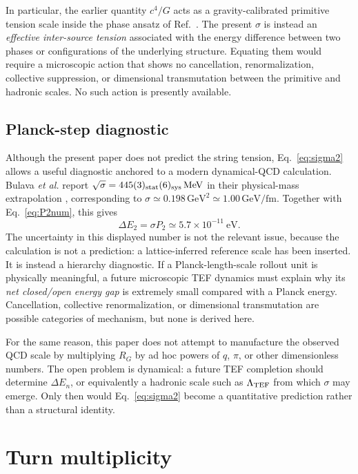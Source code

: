\documentclass[10pt]{article}
\begin{document}
In particular, the earlier quantity $c^4/G$ acts as a gravity-calibrated primitive tension scale inside the phase ansatz of Ref.~\cite{WuWeakMixing}.  The present $\sigma$ is instead an \emph{effective inter-source tension} associated with the energy difference between two phases or configurations of the underlying structure.  Equating them would require a microscopic action that shows no cancellation, renormalization, collective suppression, or dimensional transmutation between the primitive and hadronic scales.  No such action is presently available.


\subsection{Planck-step diagnostic}

Although the present paper does not predict the string tension, Eq.~\eqref{eq:sigma2} allows a useful diagnostic anchored to a modern dynamical-QCD calculation. Bulava \emph{et al.} report $\sqrt{\sigma}=445(3)_{\rm stat}(6)_{\rm sys}\,\mathrm{MeV}$ in their physical-mass extrapolation \cite{Bulava2024}, corresponding to $\sigma\simeq0.198\,\mathrm{GeV}^2\simeq1.00\,\mathrm{GeV/fm}$. Together with Eq.~\eqref{eq:P2num}, this gives
\begin{equation}
\boxed{
\Delta E_2=\sigma P_2
\simeq 5.7\times10^{-11}\ \mathrm{eV}.
}
\label{eq:gapdiagnostic}
\end{equation}
The uncertainty in this displayed number is not the relevant issue, because the calculation is not a prediction: a lattice-inferred reference scale has been inserted. It is instead a hierarchy diagnostic. If a Planck-length-scale rollout unit is physically meaningful, a future microscopic TEF dynamics must explain why its \emph{net closed/open energy gap} is extremely small compared with a Planck energy. Cancellation, collective renormalization, or dimensional transmutation are possible categories of mechanism, but none is derived here.

For the same reason, this paper does not attempt to manufacture the observed QCD scale by multiplying $R_G$ by ad hoc powers of $q$, $\pi$, or other dimensionless numbers.  The open problem is dynamical: a future TEF completion should determine $\Delta E_n$, or equivalently a hadronic scale such as $\Lambda_{\rm TEF}$ from which $\sigma$ may emerge.  Only then would Eq.~\eqref{eq:sigma2} become a quantitative prediction rather than a structural identity.

\section{Turn multiplicity}
\label{sec:ntwo}
\end{document}
